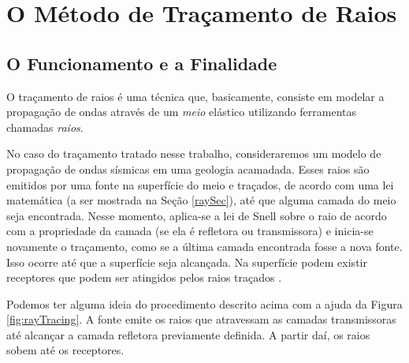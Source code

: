 \chapter{O Método de Traçamento de Raios}

    \label{cap:RT}

    \section{O Funcionamento e a Finalidade}
    
        O traçamento de raios é uma técnica que, basicamente, consiste em modelar a propagação de ondas através de um \textit{meio} elástico utilizando ferramentas chamadas \textit{raios}. 
        
        No caso do traçamento tratado nesse trabalho, consideraremos um modelo de propagação de ondas sísmicas em uma geologia acamadada. Esses raios são emitidos por uma fonte na superfície do meio e traçados, de acordo com uma lei matemática (a ser mostrada na Seção \ref{raySec}), até que alguma camada do meio seja encontrada. Nesse momento, aplica-se a lei de Snell sobre o raio de acordo com a propriedade da camada (se ela é refletora ou transmissora) e inicia-se novamente o traçamento, como se a última camada encontrada fosse a nova fonte. Isso ocorre até que a superfície seja alcançada. Na superfície podem existir receptores que podem ser atingidos pelos raios traçados \cite{notasAulas2017}.
        
        Podemos ter alguma ideia do procedimento descrito acima com a ajuda da Figura \ref{fig:rayTracing}. A fonte emite os raios que atravessam as camadas transmissoras até alcançar a camada refletora previamente definida. A partir daí, os raios sobem até os receptores.
        
